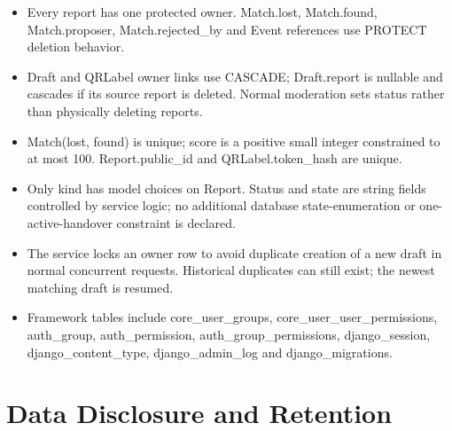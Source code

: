 \documentclass[12pt,a4paper,oneside]{report}
\begin{document}
\begin{itemize}

\item Every report has one protected owner. Match.lost, Match.found, Match.proposer, Match.rejected\_by and Event references use PROTECT deletion behavior.

\item Draft and QRLabel owner links use CASCADE; Draft.report is nullable and cascades if its source report is deleted. Normal moderation sets status rather than physically deleting reports.

\item Match(lost, found) is unique; score is a positive small integer constrained to at most 100. Report.public\_id and QRLabel.token\_hash are unique.

\item Only kind has model choices on Report. Status and state are string fields controlled by service logic; no additional database state-enumeration or one-active-handover constraint is declared.

\item The service locks an owner row to avoid duplicate creation of a new draft in normal concurrent requests. Historical duplicates can still exist; the newest matching draft is resumed.

\item Framework tables include core\_user\_groups, core\_user\_user\_permissions, auth\_group, auth\_permission, auth\_group\_permissions, django\_session, django\_content\_type, django\_admin\_log and django\_migrations.

\end{itemize}


\section{Data Disclosure and Retention}
\end{document}
